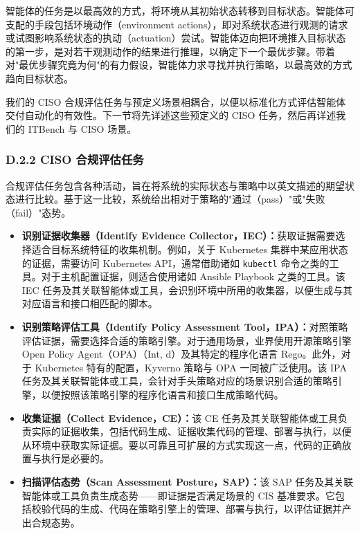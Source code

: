 智能体的任务是以最高效的方式，将环境从其初始状态转移到目标状态。智能体可支配的手段包括环境动作（environment actions），即对系统状态进行观测的请求或试图影响系统状态的执动（actuation）尝试。智能体迈向把环境推入目标状态的第一步，是对若干观测动作的结果进行推理，以确定下一个最优步骤。带着对"最优步骤究竟为何"的有力假设，智能体力求寻找并执行策略，以最高效的方式趋向目标状态。

我们的 CISO 合规评估任务与预定义场景相耦合，以便以标准化方式评估智能体交付自动化的有效性。下一节将先详述这些预定义的 CISO 任务，然后再详述我们的 ITBench 与 CISO 场景。

\subsubsection{D.2.2 CISO 合规评估任务}

合规评估任务包含各种活动，旨在将系统的实际状态与策略中以英文描述的期望状态进行比较。基于这一比较，系统给出相对于策略的"通过（pass）"或"失败（fail）"态势。

\begin{itemize}
\item \textbf{识别证据收集器（Identify Evidence Collector，IEC）：}获取证据需要选择适合目标系统特征的收集机制。例如，关于 Kubernetes 集群中某应用状态的证据，需要访问 Kubernetes API，通常借助诸如 \texttt{kubectl} 命令之类的工具。对于主机配置证据，则适合使用诸如 Ansible Playbook 之类的工具。该 IEC 任务及其关联智能体或工具，会识别环境中所用的收集器，以便生成与其对应语言和接口相匹配的脚本。
\item \textbf{识别策略评估工具（Identify Policy Assessment Tool，IPA）：}对照策略评估证据，需要选择合适的策略引擎。对于通用场景，业界使用开源策略引擎 Open Policy Agent（OPA）（Int, d）及其特定的程序化语言 Rego。此外，对于 Kubernetes 特有的配置，Kyverno 策略与 OPA 一同被广泛使用。该 IPA 任务及其关联智能体或工具，会针对手头策略对应的场景识别合适的策略引擎，以便按照该策略引擎的程序化语言和接口生成策略代码。
\item \textbf{收集证据（Collect Evidence，CE）：}该 CE 任务及其关联智能体或工具负责实际的证据收集，包括代码生成、证据收集代码的管理、部署与执行，以便从环境中获取实际证据。要以可靠且可扩展的方式实现这一点，代码的正确放置与执行是必要的。
\item \textbf{扫描评估态势（Scan Assessment Posture，SAP）：}该 SAP 任务及其关联智能体或工具负责生成态势——即证据是否满足场景的 CIS 基准要求。它包括校验代码的生成、代码在策略引擎上的管理、部署与执行，以评估证据并产出合规态势。
\end{itemize}

